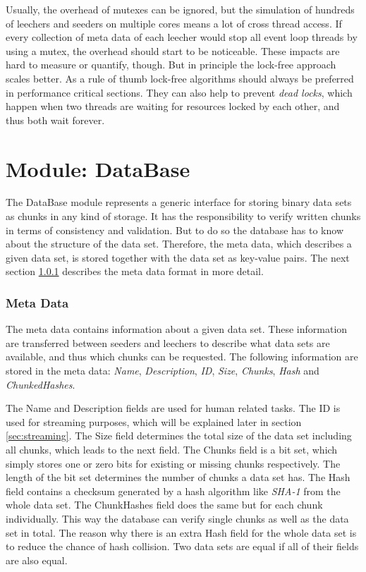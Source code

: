 Usually, the overhead of mutexes can be ignored, but the simulation of hundreds of leechers and seeders on multiple cores means a lot of cross thread access. If every collection of meta data of each leecher would stop all event loop threads by using a mutex, the overhead should start to be noticeable. These impacts are hard to measure or quantify, though. But in principle the lock-free approach scales better. As a rule of thumb lock-free algorithms should always be preferred in performance critical sections. They can also help to prevent \emph{dead locks}, which happen when two threads are waiting for resources locked by each other, and thus both wait forever.

\cleardoublepage
\section{Module: DataBase}
\label{sec:database}
The DataBase module represents a generic interface for storing binary data sets as chunks in any kind of storage. It has the responsibility to verify written chunks in terms of consistency and validation. But to do so the database has to know about the structure of the data set. Therefore, the meta data, which describes a given data set, is stored together with the data set as key-value pairs. The next section \ref{subsubsec:metadata} describes the meta data format in more detail.

\subsubsection{Meta Data}
\label{subsubsec:metadata}
The meta data contains information about a given data set. These information are transferred between seeders and leechers to describe what data sets are available, and thus which chunks can be requested. The following information are stored in the meta data: \emph{Name}, \emph{Description}, \emph{ID}, \emph{Size}, \emph{Chunks}, \emph{Hash} and \emph{ChunkedHashes}.

The Name and Description fields are used for human related tasks. The ID is used for streaming purposes, which will be explained later in section \ref{sec:streaming}. The Size field determines the total size of the data set including all chunks, which leads to the next field. The Chunks field is a bit set, which simply stores one or zero bits for existing or missing chunks respectively. The length of the bit set determines the number of chunks a data set has. The Hash field contains a checksum generated by a hash algorithm like \emph{SHA-1} from the whole data set. The ChunkHashes field does the same but for each chunk individually. This way the database can verify single chunks as well as the data set in total. The reason why there is an extra Hash field for the whole data set is to reduce the chance of hash collision. Two data sets are equal if all of their fields are also equal.


